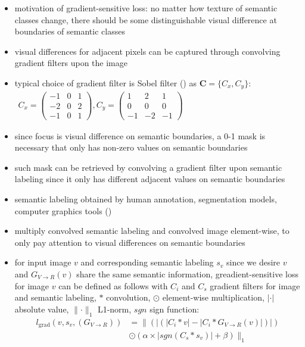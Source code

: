 \begin{itemize}
	\item motivation of gradient-sensitive loss: no matter how texture of semantic classes change, there should be some distinguishable visual difference at boundaries of semantic classes
	\item visual differences for adjacent pixels can be captured through convolving gradient filters upon the image
	\item typical choice of gradient filter is Sobel filter () as $\mathbf{C} = \{C_x, C_y\}$:
	$\begin{array}{cc}
	C_x = 
	\begin{pmatrix}
	-1 & 0 & 1\\
	-2 & 0 & 2\\
	-1 & 0 & 1
	\end{pmatrix},
	C_y = 
	\begin{pmatrix}
	1 & 2 & 1\\
	0 & 0 & 0\\
	-1 & -2 & -1
	\end{pmatrix}
	\end{array}$
	\item since focus is visual difference on semantic boundaries, a 0-1 mask is necessary that only has non-zero values on semantic boundaries
	\item such mask can be retrieved by convolving a gradient filter upon semantic labeling since it only has different adjacent values on semantic boundaries
	\item semantic labeling obtained by human annotation, segmentation models, computer graphics tools ()
	\item multiply convolved semantic labeling and convolved image element-wise, to only pay attention to visual differences on semantic boundaries
	\item for input image $v$ and corresponding semantic labeling $s_v$ since we desire $v$ and $G_{V\rightarrow R}(v)$ share the same semantic information, greadient-sensitive loss for image $v$ can be defined as follows with $C_i$ and $C_s$ gradient filters for image and semantic labeling, $*$ convolution, $\odot$ element-wise multiplication, $|\cdot|$ absolute value,
	$\lVert \cdot \rVert_1$ L1-norm, $sgn$ sign function:
	\begin{align}
	l_{\text{grad}}(v,s_v,(G_{V\rightarrow R})) &= \lVert(|(|C_i * v |-|C_i*G_{V\rightarrow R}(v)|)|)\\
	&\odot (\alpha \times |sgn(C_s*s_v)|+ \beta)\rVert_1\\

\end{align}
\end{itemize}
